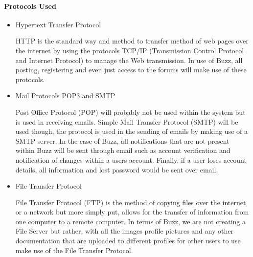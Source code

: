 \documentclass[10pt]{article}
\begin{document}
\paragraph{Protocols Used}%
\begin{itemize}
\item Hypertext Transfer Protocol

HTTP is the standard way and method to transfer method of web pages over the internet by using the protocols TCP/IP (Transmission Control Protocol and Internet Protocol) to manage the Web transmission. In use of Buzz, all posting, registering and even just access to the forums will make use of these protocols.

\item Mail Protocols POP3 and SMTP

Post Office Protocol (POP) will probably not be used within the system but is used in receiving emails. Simple Mail Transfer Protocol (SMTP) will be used though, the protocol is used in the sending of emails by making use of a SMTP server. In the case of Buzz, all notifications that are not present within Buzz will be sent through email such as account verification and notification of changes within a users account. Finally, if a user loses account details, all information and lost password would be sent over email.

\item File Transfer Protocol

File Transfer Protocol (FTP) is the method of copying files over the internet or a network but more simply put, allows for the transfer of information from one computer to a remote computer. In terms of Buzz, we are not creating a File Server but rather, with all the images profile pictures and any other documentation that are uploaded to different profiles for other users to use make use of the File Transfer Protocol.

\end{itemize}




\clearpage
\end{document}
